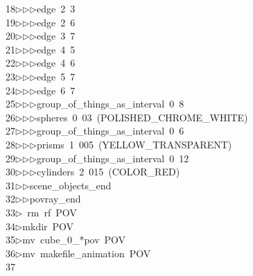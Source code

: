 \begin{tabbing}
18\>$\triangleright$\>$\triangleright$\>$\triangleright$\>edge\ 2\ 3\ \\[0pt]
19\>$\triangleright$\>$\triangleright$\>$\triangleright$\>edge\ 2\ 6\ \\[0pt]
20\>$\triangleright$\>$\triangleright$\>$\triangleright$\>edge\ 3\ 7\ \\[0pt]
21\>$\triangleright$\>$\triangleright$\>$\triangleright$\>edge\ 4\ 5\ \\[0pt]
22\>$\triangleright$\>$\triangleright$\>$\triangleright$\>edge\ 4\ 6\ \\[0pt]
23\>$\triangleright$\>$\triangleright$\>$\triangleright$\>edge\ 5\ 7\ \\[0pt]
24\>$\triangleright$\>$\triangleright$\>$\triangleright$\>edge\ 6\ 7\ \\[0pt]
25\>$\triangleright$\>$\triangleright$\>$\triangleright$\>group\_of\_things\_as\_interval\ 0\ 8\ \\[0pt]
26\>$\triangleright$\>$\triangleright$\>$\triangleright$\>spheres\ 0\ 03\ (POLISHED\_CHROME\_WHITE)\ \\[0pt]
27\>$\triangleright$\>$\triangleright$\>$\triangleright$\>group\_of\_things\_as\_interval\ 0\ 6\ \\[0pt]
28\>$\triangleright$\>$\triangleright$\>$\triangleright$\>prisms\ 1\ 005\ (YELLOW\_TRANSPARENT)\ \\[0pt]
29\>$\triangleright$\>$\triangleright$\>$\triangleright$\>group\_of\_things\_as\_interval\ 0\ 12\ \\[0pt]
30\>$\triangleright$\>$\triangleright$\>$\triangleright$\>cylinders\ 2\ 015\ (COLOR\_RED)\ \\[0pt]
31\>$\triangleright$\>$\triangleright$\>scene\_objects\_end\ \\[0pt]
32\>$\triangleright$\>$\triangleright$\>povray\_end\\[0pt]
33\>$\triangleright$\>\ rm\ rf\ POV\\[0pt]
34\>$\triangleright$\>mkdir\ POV\\[0pt]
35\>$\triangleright$\>mv\ cube\_0\_*pov\ POV\\[0pt]
36\>$\triangleright$\>mv\ makefile\_animation\ POV\\[0pt]
37\>\end{tabbing}
